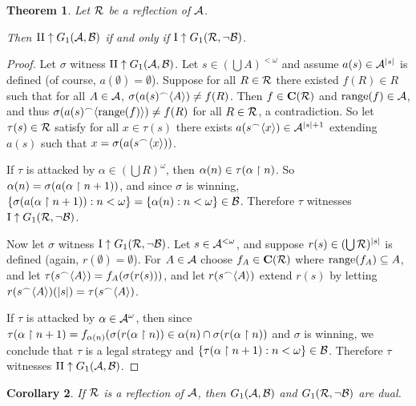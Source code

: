 \documentclass{amsart}
\theoremstyle{plain}
\newtheorem{theorem}{Theorem}
\newtheorem{corollary}[theorem]{Corollary}
\theoremstyle{definition}
\theoremstyle{remark}
\theoremstyle{plain}
\theoremstyle{definition}
\theoremstyle{remark}
\begin{document}
\begin{theorem}
  Let \(\mathcal{R}\) be a reflection of \(\mathcal{A}\). 

  Then
  \(\mathrm{II}\uparrow G_{1}(\mathcal{A},\mathcal{B})\) if and only if
  \(\mathrm{I}\uparrow G_{1}(\mathcal{R},\neg\mathcal{B})\).
\end{theorem}

\begin{proof}
  Let \(\sigma\) witness 
  \(\mathrm{II}\uparrow G_{1}(\mathcal{A},\mathcal{B})\).
  Let \(s\in(\bigcup A)^{<\omega}\) and assume \(a(s)\in\mathcal{A}^{|s|}\) is defined
  (of course, \(a(\emptyset)=\emptyset\)).
  Suppose for all \(R\in\mathcal{R}\) there existed \(f(R)\in R\) such that for all
  \(A\in\mathcal{A}\), \(\sigma(a(s){^\frown}\langle A\rangle)\not=f(R)\). Then
  \(f\in\mathbf C(\mathcal{R})\) and \(\text{range}(f)\in\mathcal{A}\), and thus 
  \(\sigma(a(s){^\frown}\langle\text{range}(f)\rangle)\not=f(R)\) for all \(R\in\mathcal{R}\), a contradiction.
  So let \(\tau(s)\in\mathcal{R}\) satisfy for all \(x\in\tau(s)\) there exists
  \(a(s{^\frown}\langle x\rangle)\in\mathcal{A}^{|s|+1}\) extending \(a(s)\) such that 
  \(x=\sigma(a(s{^\frown}\langle x\rangle))\).

  If \(\tau\) is attacked by \(\alpha\in(\bigcup R)^\omega\), then 
  \(\alpha(n)\in\tau(\alpha\restriction n)\). So \(\alpha(n)=\sigma(a(\alpha\restriction n+1))\),
  and since \(\sigma\) is winning, 
  \(\{\sigma(a(\alpha\restriction n+1)):n<\omega\}=\{\alpha(n):n<\omega\}\in\mathcal{B}\).
  Therefore \(\tau\) witnesses
  \(\mathrm{I}\uparrow G_{1}(\mathcal{R},\neg\mathcal{B})\).

  Now let \(\sigma\) witness
  \(\mathrm{I}\uparrow G_{1}(\mathcal{R},\neg\mathcal{B})\).
  Let \(s\in\mathcal{A}^{<\omega}\), and suppose \(r(s)\in(\bigcup \mathcal{R})^{|s|}\) is defined
  (again, \(r(\emptyset)=\emptyset\)). For \(A\in\mathcal{A}\) choose \(f_A\in\mathbf C(\mathcal{R})\)
  where \(\text{range}(f_A)\subseteq A\), and let \(\tau(s{^\frown}\langle A\rangle)=f_A(\sigma(r(s)))\),
  and let \(r(s{^\frown}\langle A\rangle)\) extend \(r(s)\) by letting
  \(r(s{^\frown}\langle A\rangle)(|s|)=\tau(s{^\frown}\langle A\rangle)\).

  If \(\tau\) is attacked by \(\alpha\in\mathcal{A}^\omega\), 
  then since \(\tau(\alpha\restriction n+1)=f_{\alpha(n)}(\sigma(r(\alpha\restriction n))\in\alpha(n)\cap\sigma(r(\alpha\restriction n))\)
  and \(\sigma\) is winning, we conclude that \(\tau\) is a legal strategy and
  \(\{\tau(\alpha\restriction n+1):n<\omega\}\in\mathcal{B}\).
  Therefore \(\tau\) witnesses
  \(\mathrm{II}\uparrow G_{1}(\mathcal{A},\mathcal{B})\).
\end{proof}

\begin{corollary}\label{mainResult}
  If \(\mathcal{R}\) is a reflection of \(\mathcal{A}\),
  then \(G_{1}(\mathcal{A},\mathcal{B})\) and \(G_{1}(\mathcal{R},\neg\mathcal{B})\)
  are  dual.
\end{corollary}
\end{document}
